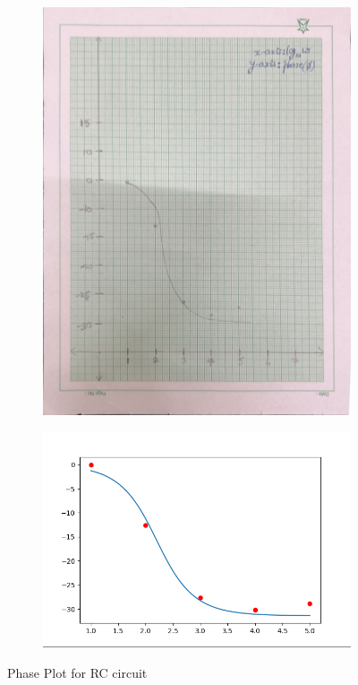 \documentclass{article}
\begin{document}
\begin{figure}[H]
    \centering
    \begin{subfigure}[b]{0.45\textwidth}
        \centering
        \includegraphics[width=\textwidth]{figs/phase1.png}
    \end{subfigure}
    \hfill
    \begin{subfigure}[b]{0.45\textwidth}
        \centering
        \includegraphics[width=1.7\textwidth]{figs/phase_1cas.png}
    \end{subfigure}
    
    \caption{Phase Plot for RC circuit}
\end{figure}
\end{document}
